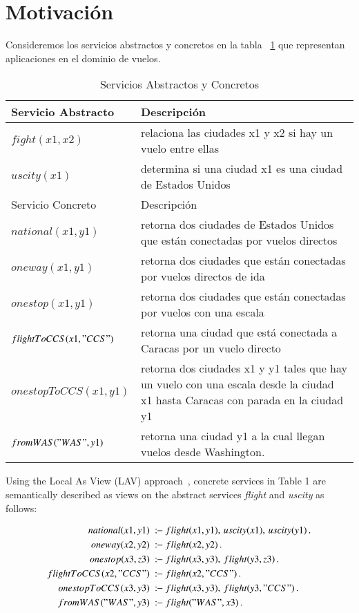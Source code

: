 \documentclass{llncs}
\newcommand{\qrule}{:\!\!-}
\begin{document}
\section{Motivación}

Consideremos los servicios abstractos y concretos en la tabla
~\ref{table:services} que representan aplicaciones en el dominio de vuelos.

\begin{table}
\begin{tabular}{| l| l |}
\hline
Servicio Abstracto & Descripción \\
\hline
$fight(x1,x2)$ & relaciona las ciudades x1 y x2 si hay un vuelo entre ellas\\
\hline
$uscity(x1)$ &  determina si una ciudad x1 es una ciudad de Estados Unidos\\
\hline \hline
Servicio Concreto & Descripción \\
\hline
$national(x1,y1)$&  retorna dos ciudades de Estados Unidos que están conectadas
por vuelos directos \\
\hline
$oneway(x1,y1)$ & retorna dos ciudades que están conectadas por vuelos directos
de ida\\
\hline
$onestop(x1,y1)$ & retorna dos ciudades que están conectadas por vuelos con una
escala\\
\hline
$ flightToCCS(x1,"CCS")$ & retorna una ciudad que está conectada a Caracas por
un vuelo directo\\
 \hline
$ onestopToCCS(x1,y1)$ & retorna dos ciudades x1 y y1 tales que hay un vuelo con
una escala desde la ciudad x1 hasta Caracas con parada en la ciudad y1\\
 \hline
 $fromWAS("WAS",y1)$ &  retorna una ciudad y1 a la cual llegan vuelos desde
Washington.\\
 \hline
\end{tabular}
\label{table:services}
\caption{Servicios Abstractos y Concretos}
\end{table}

Using the  Local As View (LAV) approach~\cite{AmbiteISWC09}, concrete services in Table 1 are semantically described as views on the abstract services {\it flight} and {\it uscity} as follows:   

\begin{alignat*}{1}
national(x1,y1)\ &\qrule\ flight(x1,y1),\,  uscity(x1),\,  uscity(y1)\,. \\
oneway(x2,y2)\ &\qrule\ flight(x2,y2)\,. \\
onestop(x3,z3)\ &\qrule\ flight(x3,y3),\, flight(y3,z3)\,. \\
flightToCCS(x2,"CCS")\ &\qrule\ flight(x2,"CCS")\,. \\
onestopToCCS(x3,y3)\ &\qrule\ flight(x3,y3),\, flight(y3,"CCS")\,. \\
fromWAS("WAS",y3)\ &\qrule\ flight("WAS",x3)\,. \\
\end{alignat*}
\end{document}
